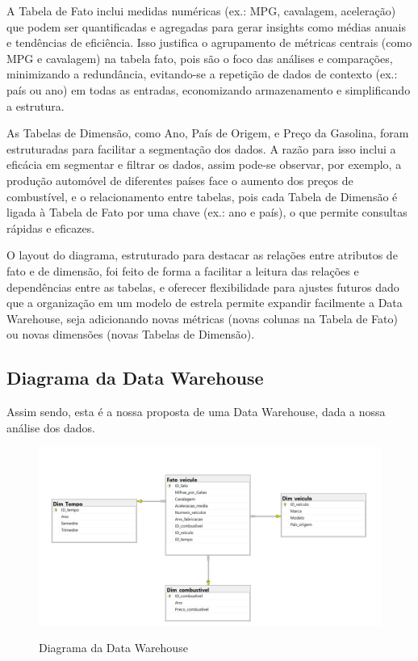 \documentclass[a4paper]{article}
\begin{document}
A Tabela de Fato inclui medidas numéricas (ex.: MPG, cavalagem, aceleração) que podem ser quantificadas e agregadas para gerar insights como médias anuais 
e tendências de eficiência. Isso justifica o agrupamento de métricas centrais (como MPG e cavalagem) na tabela fato, pois são o foco das análises e comparações, 
minimizando a redundância, evitando-se a repetição de dados de contexto (ex.: país ou ano) em todas as entradas, economizando armazenamento e simplificando a estrutura.

As Tabelas de Dimensão, como Ano, País de Origem, e Preço da Gasolina, foram estruturadas para facilitar a segmentação dos dados. A razão para isso inclui a
eficácia em segmentar e filtrar os dados, assim pode-se observar, por exemplo, a produção automóvel de diferentes países face o aumento dos preços de combustível, e o
relacionamento entre tabelas, pois cada Tabela de Dimensão é ligada à Tabela de Fato por uma chave (ex.: ano e país), o que permite consultas rápidas e eficazes.

O layout do diagrama, estruturado para destacar as relações entre atributos de fato e de dimensão, foi feito de forma a facilitar a leitura das relações e dependências 
entre as tabelas, e oferecer flexibilidade para ajustes futuros dado que a organização em um modelo de estrela permite expandir facilmente a Data Warehouse, 
seja adicionando novas métricas (novas colunas na Tabela de Fato) ou novas dimensões (novas Tabelas de Dimensão).

\newpage
\subsection{Diagrama da Data Warehouse}
Assim sendo, esta é a nossa proposta de uma Data Warehouse, dada a nossa análise dos dados.

\begin{figure}[h!]
    \centering
    \includegraphics[width=1\textwidth]{Recursos/DiagramaCrisePetroleo.png} %
    \vspace{0.5cm}
    \label{fig:dcri}
    \caption{Diagrama da Data Warehouse}
\end{figure}
\newpage
\end{document}
